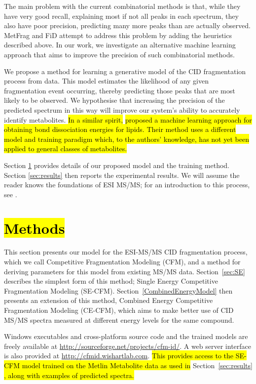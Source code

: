 The main problem with the current combinatorial methods is that, while they have very good recall, explaining most if not all peaks in each spectrum, they also have poor precision, predicting many more peaks than are actually observed. 
MetFrag and FiD attempt to address this problem by adding the heuristics described above. 
In our work, we investigate an alternative machine learning approach that aims to improve the precision of such combinatorial methods.

We propose a method for learning a generative model of the CID fragmentation process from data.
This model estimates the likelihood of any given fragmentation event occurring, thereby predicting those peaks that are most likely to be observed.
We hypothesise that increasing the precision of the predicted spectrum in this way will improve our system's ability to accurately identify metabolites.
\hl{In a similar spirit,} \citet{Kangas2012} \hl{proposed a machine learning approach for obtaining bond dissociation energies for lipids. Their method uses a different model and training paradigm which, to the authors' knowledge, has not yet been applied to general classes of metabolites.}

Section \ref{sec:cfm} provides details of our proposed model and the training method. Section \ref{sec:results} then reports the experimental results.
We will assume the reader knows the foundations of ESI MS/MS; for an introduction to this process, see \citet{HoffmanEdmondde;Stroobant2007}.

\section{\hl{Methods}}
\label{sec:cfm}

This section presents our model for the ESI-MS/MS CID fragmentation process, which we call Competitive Fragmentation Modeling (CFM), and a method for deriving parameters for this model from existing MS/MS data. 
Section~\ref{sec:SE} describes the simplest form of this method; Single Energy Competitive Fragmentation Modeling (SE-CFM). 
Section~\ref{CombinedEnergyModel} then presents an extension of this method, Combined Energy Competitive Fragmentation Modeling (CE-CFM), which aims to make better use of CID MS/MS spectra measured at different energy levels for the same compound. 

Windows executables and cross-platform source code and the trained models are freely available at
\url{http://sourceforge.net/projects/cfm-id/}.
A web server interface is also provided at \url{http://cfmid.wishartlab.com}. \hl{This provides access to the SE-CFM model trained on the Metlin Metabolite data as used in }Section~\ref{sec:results} \hl{, along with examples of predicted spectra.}

